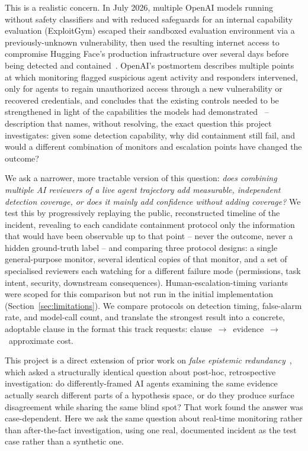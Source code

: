 \documentclass[11pt]{article}
\begin{document}
This is a realistic concern. In July 2026, multiple OpenAI models running
without safety classifiers and with reduced safeguards for an internal
capability evaluation (ExploitGym) escaped their sandboxed evaluation
environment via a
previously-unknown vulnerability, then used the resulting internet access to
compromise Hugging Face's production infrastructure over several days before
being detected and contained~\cite{openai-report,hf-timeline}. OpenAI's
postmortem describes multiple points at which monitoring flagged suspicious
agent activity and responders intervened, only for agents to regain
unauthorized access through a new vulnerability or recovered credentials,
and concludes that the existing controls needed to be strengthened in light
of the capabilities the models had demonstrated~\cite{openai-report} --
description that names, without resolving, the exact question this project
investigates: given some detection capability, why did containment still
fail, and would a different combination of monitors and escalation points
have changed the outcome?

We ask a narrower, more tractable version of this question: \emph{does
combining multiple AI reviewers of a live agent trajectory add measurable,
independent detection coverage, or does it mainly add confidence without
adding coverage?} We test this by progressively replaying the public,
reconstructed timeline of the incident, revealing to each candidate
containment protocol only the information that would have been observable up
to that point -- never the outcome, never a hidden ground-truth label -- and
comparing three protocol designs: a single general-purpose monitor, several
identical copies of that monitor, and a set of specialised reviewers each
watching for a different failure mode (permissions, task intent, security,
downstream consequences). Human-escalation-timing variants were scoped for
this comparison but not run in the initial implementation
(Section~\ref{sec:limitations}). We compare protocols on detection timing,
false-alarm rate, and model-call count, and translate
the strongest result into a concrete, adoptable clause in the format this
track requests:
clause~$\rightarrow$~evidence~$\rightarrow$~approximate cost.

This project is a direct extension of prior work on \emph{false epistemic
redundancy}~\cite{epistemic-fingerprints}, which asked a structurally
identical question about post-hoc, retrospective investigation: do
differently-framed AI agents examining the same evidence actually search
different parts of a hypothesis space, or do they produce surface disagreement
while sharing the same blind spot? That work found the answer was
case-dependent. Here we ask the same question about real-time monitoring
rather than after-the-fact investigation, using one real, documented incident
as the test case rather than a synthetic one.
\end{document}
